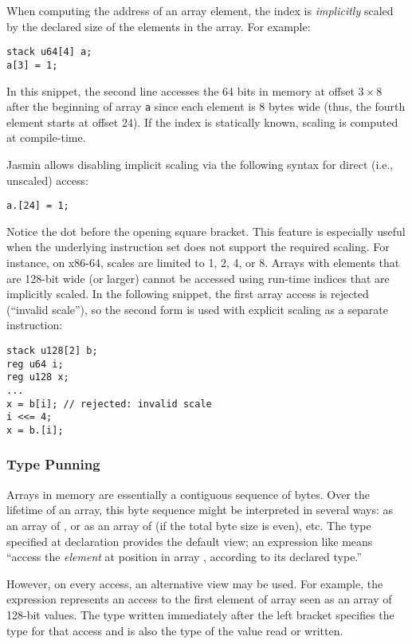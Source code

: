 When computing the address of an array element, the index is \textit{implicitly} scaled by the declared size of the elements in the array. For example:

\begin{lstlisting}[style=jasmin]
stack u64[4] a;
a[3] = 1;
\end{lstlisting}

In this snippet, the second line accesses the 64 bits in memory at offset \(3 \times 8\) after the beginning of array \texttt{a} since each element is 8 bytes wide (thus, the fourth element starts at offset 24). If the index is statically known, scaling is computed at compile-time.

Jasmin allows disabling implicit scaling via the following syntax for direct (i.e., unscaled) access:

\begin{lstlisting}[style=jasmin]
a.[24] = 1;
\end{lstlisting}

Notice the dot before the opening square bracket. This feature is especially useful when the underlying instruction set does not support the required scaling. For instance, on x86-64, scales are limited to 1, 2, 4, or 8. Arrays with elements that are 128-bit wide (or larger) cannot be accessed using run-time indices that are implicitly scaled. In the following snippet, the first array access is rejected (“invalid scale”), so the second form is used with explicit scaling as a separate instruction:

\begin{lstlisting}[style=jasmin]
stack u128[2] b;
reg u64 i;
reg u128 x;
...
x = b[i]; // rejected: invalid scale
i <<= 4;
x = b.[i];
\end{lstlisting}
\subsubsection{Type Punning}

Arrays in memory are essentially a contiguous sequence of bytes. Over the lifetime of an array, this byte sequence might be interpreted in several ways: as an array of , or as an array of  (if the total byte size is even), etc. The type specified at declaration provides the default view; an expression like  means “access the \textit{element} at position  in array , according to its declared type.”

However, on every access, an alternative view may be used. For example, the expression  represents an access to the first element of array  seen as an array of 128-bit values. The type written immediately after the left bracket specifies the type for that access and is also the type of the value read or written.

